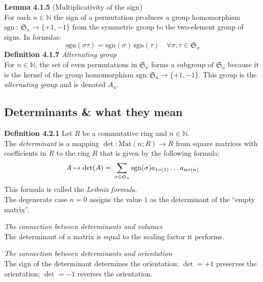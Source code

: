 \documentclass[8pt,landscape]{article}
\begin{document}
\begin{multicols}{3}
    \textbf{Lemma 4.1.5} (Multiplicativity of the sign) \\
    For each $n \in \mathbb{N}$ the sign of a permutation produces a group homomorphism
    $\mathrm{sgn} \ : \ \mathfrak{S}_n \to \{+1, -1\}$
    from the symmetric group to the two-element group of signs.
    In formulas:
    \[
        \mathrm{sgn}(\sigma \tau) = \mathrm{sgn}(\sigma) \, \mathrm{sgn}(\tau) \quad
        \forall \sigma, \tau \in \mathfrak{S}_n
    \]
    \textbf{Definition 4.1.7} \emph{Alternating group} \\
    For $n \in \mathbb{N}$, the set of even permutations in $\mathfrak{S}_n$ forms a
    subgroup of $\mathfrak{S}_n$ because it is the kernel of the group homomorphism
    $\mathrm{sgn} : \mathfrak{S}_n \to \{+1, -1\}$.
    This group is the \emph{alternating group} and is denoted $A_n$.

    \subsection{Determinants \& what they mean}

    \textbf{Definition 4.2.1}
    Let $R$ be a commutative ring and $n \in \mathbb{N}$. \\
    The \emph{determinant} is a mapping
    $\det : \mathrm{Mat}(n;R) \to R$ from square matrices with coefficients in $R$
    to the ring $R$ that is given by the following formula:
    \[
        A
        \mapsto \det (A) = \\
        \sum_{\sigma \in \mathfrak{S}_n}
        \mathrm{sgn}(\sigma) a_{1\sigma(1)} \ldots a_{n\sigma(n)}
    \]
    This formula is called the \emph{Leibniz formula}. \\
    The degenerate case $n=0$ assigns the value $1$ as the determinant of the
    ``empty matrix''.

    \emph{The connection between determinants and volumes} \\
    The determinant of a matrix is equal to the scaling factor it performs.

    \emph{The connection between determinants and orientation} \\
    The sign of the determinant determines the orientation:
    $\det = +1$ preserves the orientation;
    $\det = -1$ reverses the orientation.


\end{multicols}
\end{document}
